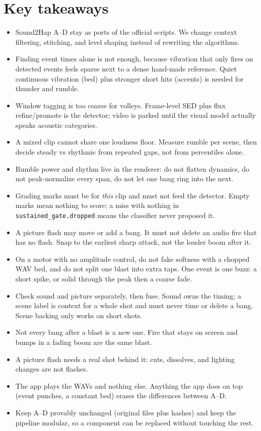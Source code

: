 \documentclass[11pt,a4paper]{article}
\begin{document}
\section{Key takeaways}
\begin{itemize}[leftmargin=*,itemsep=2pt]
  \item Sound2Hap A--D stay as ports of the official scripts. We change context filtering, stitching, and level shaping instead of rewriting the algorithms.
  \item Finding event times alone is not enough, because vibration that only fires on detected events feels sparse next to a dense hand-made reference. Quiet continuous vibration (bed) plus stronger short hits (accents) is needed for thunder and rumble.
  \item Window tagging is too coarse for volleys. Frame-level SED plus flux refine/promote is the detector; video is parked until the visual model actually speaks acoustic categories.
  \item A mixed clip cannot share one loudness floor. Measure rumble per scene, then decide steady vs rhythmic from repeated gaps, not from percentiles alone.
  \item Rumble power and rhythm live in the renderer: do not flatten dynamics, do not peak-normalize every span, do not let one bang ring into the next.
  \item Grading marks must be for \emph{this} clip and must not feed the detector. Empty marks mean nothing to score; a miss with nothing in \texttt{sustained\_gate.dropped} means the classifier never proposed it.
  \item A picture flash may move or add a bang. It must not delete an audio fire that has no flash. Snap to the earliest sharp attack, not the louder boom after it.
  \item On a motor with no amplitude control, do not fake softness with a chopped WAV bed, and do not split one blast into extra taps. One event is one buzz: a short spike, or solid through the peak then a coarse fade.
  \item Check sound and picture separately, then fuse. Sound owns the timing; a scene label is context for a whole shot and must never time or delete a bang. Scene backing only works on short shots.
  \item Not every bang after a blast is a new one. Fire that stays on screen and bumps in a fading boom are the same blast.
  \item A picture flash needs a real shot behind it: cuts, dissolves, and lighting changes are not flashes.
  \item The app plays the WAVs and nothing else. Anything the app does on top (event punches, a constant bed) erases the differences between A--D.
  \item Keep A--D provably unchanged (original files plus hashes) and keep the pipeline modular, so a component can be replaced without touching the rest.\end{itemize}
\end{document}
